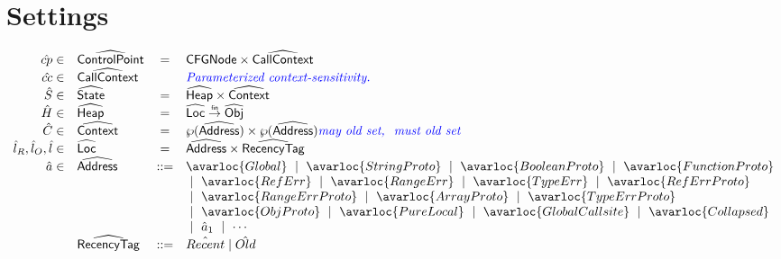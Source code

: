 \section{Settings}
\[
\begin{array}{rlcl}
\acp \in & \aControlPoint & = & \SF{CFGNode} \times \abs{CallContext} \\
\hat{cc} \in & \abs{CallContext} &  & \comment{\inblue  Parameterized context-sensitivity.}\\

\hat{S} \in & \aState & = & \aHeap \times \aContext\\
\hat{H} \in & \aHeap & = & \aLoc \finto \aObj \\
\hat{C} \in & \aContext & = & \powerset{\aAddress} \times \powerset{\aAddress}
    \comment{\inblue may old set, \ must old set} \\

\hat{l}_R,\hat{l}_O,\hat{l} \in & \aLoc &  = & \aAddress \times \abs{RecencyTag}\\
\hat{a} \in & \aAddress & ::= & \avarloc{Global} ~\mid~ 
                                \avarloc{StringProto} ~\mid~ 
                                \avarloc{BooleanProto} ~\mid~ 
                                \avarloc{FunctionProto} \\
                          & & & ~\mid~ 
                                \avarloc{RefErr} ~\mid~ 
                                \avarloc{RangeErr} ~\mid~ 
                                \avarloc{TypeErr} ~\mid~ 
                                \avarloc{RefErrProto}  \\
                          & & & ~\mid~ 
                                 \avarloc{RangeErrProto} ~\mid~ 
                                 \avarloc{ArrayProto} ~\mid~ 
                                 \avarloc{TypeErrProto} \\
                          & & & ~\mid~ 
                                 \avarloc{ObjProto} ~\mid~ 
                                 \avarloc{PureLocal} ~\mid~ 
                                 \avarloc{GlobalCallsite} ~\mid~ 
                                 \avarloc{Collapsed} \\
                          & & & ~\mid~
                                 \hat{a}_1 ~\mid~ \cdots \\
    & \abs{RecencyTag} & ::= & \hat{Recent} \mid \hat{Old}\\


\end{array}\]
